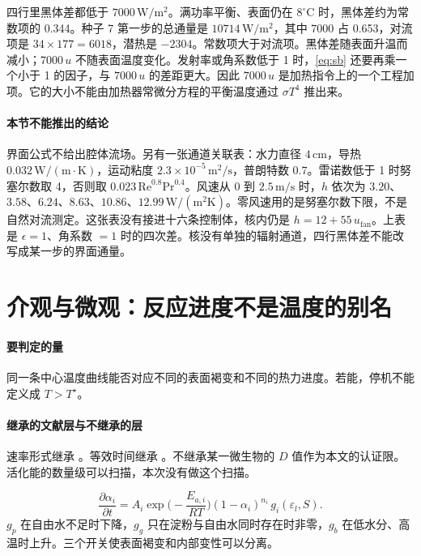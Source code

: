 四行里黑体差都低于 \(7000\,\mathrm{W}/\mathrm{m}^2\)。满功率平衡、表面仍在 \(8^\circ\mathrm{C}\) 时，黑体差约为常数项的 0.344。种子 7 第一步的总通量是 \(10714\,\mathrm{W}/\mathrm{m}^2\)，其中 \(7000\) 占 0.653，对流项是 \(34\times 177=6018\)，潜热是 \(-2304\)。常数项大于对流项。黑体差随表面升温而减小；\(7000\,u\) 不随表面温度变化。发射率或角系数低于 1 时，\eqref{eq:sb} 还要再乘一个小于 1 的因子，与 \(7000\,u\) 的差距更大。因此 \(7000\,u\) 是加热指令上的一个工程加项。它的大小不能由加热器常微分方程的平衡温度通过 \(\sigma T^4\) 推出来。

\paragraph{本节不能推出的结论}
界面公式不给出腔体流场。另有一张通道关联表：水力直径 \(4\,\mathrm{cm}\)，导热 \(0.032\,\mathrm{W}/(\mathrm{m}\cdot\mathrm{K})\)，运动粘度 \(2.3\times 10^{-5}\,\mathrm{m}^2/\mathrm{s}\)，普朗特数 \(0.7\)。雷诺数低于 1 时努塞尔数取 4，否则取 \(0.023\,\mathrm{Re}^{0.8}\mathrm{Pr}^{0.4}\)。风速从 0 到 \(2.5\,\mathrm{m}/\mathrm{s}\) 时，\(h\) 依次为 \(3.20\)、\(3.58\)、\(6.24\)、\(8.63\)、\(10.86\)、\(12.99\,\mathrm{W}/(\mathrm{m}^2\mathrm{K})\)。零风速用的是努塞尔数下限，不是自然对流测定。这张表没有接进十六条控制体，核内仍是 \(h=12+55\,u_{\mathrm{fan}}\)。上表是 \(\epsilon=1\)、角系数 \(=1\) 时的四次差。核没有单独的辐射通道，四行黑体差不能改写成某一步的界面通量。

\section{介观与微观：反应进度不是温度的别名}

\paragraph{要判定的量}
同一条中心温度曲线能否对应不同的表面褐变和不同的热力进度。若能，停机不能定义成 \(T>T^\star\)。

\paragraph{继承的文献层与不继承的层}
速率形式继承 \cite{vanboekel2008}。等效时间继承 \cite{holdsworth1997}。不继承某一微生物的 \(D\) 值作为本文的认证限。活化能的数量级可以扫描，本次没有做这个扫描。

\begin{equation}
\label{eq:kinetics}
\frac{\partial\alpha_i}{\partial t}
=A_i\exp\!\Big(-\frac{E_{a,i}}{RT}\Big)
(1-\alpha_i)^{n_i}\,g_i(\varepsilon_l,S).
\end{equation}
\(g_p\) 在自由水不足时下降，\(g_g\) 只在淀粉与自由水同时存在时非零，\(g_b\) 在低水分、高温时上升。三个开关使表面褐变和内部变性可以分离。

